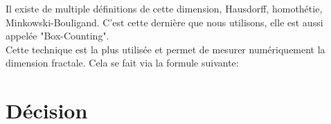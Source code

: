 \documentclass[fontsize=12pt, twoside=no]{scrartcl} %
\begin{document}
Il existe de multiple définitions de cette dimension, Hausdorff, homothétie, Minkowski-Bouligand. C'est cette dernière que nous utilisons, elle est aussi appelée "Box-Counting".\\

Cette technique est la plus utilisée et permet de mesurer numériquement la dimension fractale. Cela se fait via la formule suivante:

\vspace{0.3cm}
\begin{center}
\end{center}


\part{Décision}
\end{document}
